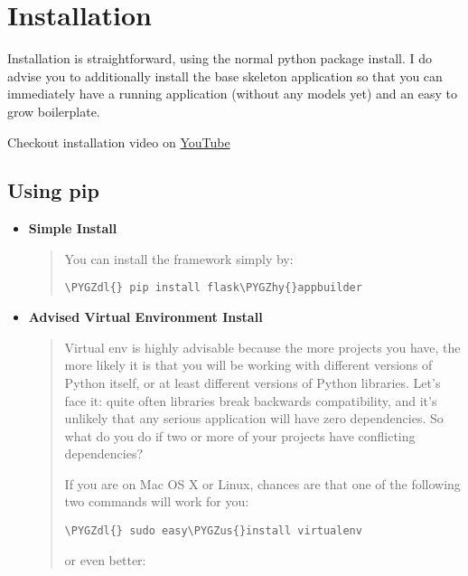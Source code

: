 \documentclass[letterpaper,10pt,english]{sphinxmanual}
\def\PYGZus{\char`\_}
\def\PYGZdl{\char`\$}
\def\PYGZhy{\char`\-}
\begin{document}
\section{Installation}
\label{installation:installation}\label{installation::doc}
Installation is straightforward, using the normal python package install.
I do advise you to additionally install the base skeleton application
so that you can immediately have a running application (without any models yet) and an easy to grow boilerplate.

Checkout installation video on \href{http://youtu.be/xvum4vfwldg}{YouTube}


\subsection{Using pip}
\label{installation:using-pip}\begin{itemize}
\item {} 
\textbf{Simple Install}
\begin{quote}

You can install the framework simply by:

\begin{Verbatim}[commandchars=\\\{\}]
\PYGZdl{} pip install flask\PYGZhy{}appbuilder
\end{Verbatim}
\end{quote}

\item {} 
\textbf{Advised Virtual Environment Install}
\begin{quote}

Virtual env is highly advisable because the more projects you have,
the more likely it is that you will be working with
different versions of Python itself, or at least different versions of Python libraries.
Let’s face it: quite often libraries break backwards compatibility,
and it’s unlikely that any serious application will have zero dependencies.
So what do you do if two or more of your projects have conflicting dependencies?

If you are on Mac OS X or Linux, chances are that one of the following two commands will work for you:

\begin{Verbatim}[commandchars=\\\{\}]
\PYGZdl{} sudo easy\PYGZus{}install virtualenv
\end{Verbatim}

or even better:


\end{quote}
\end{itemize}
\end{document}
